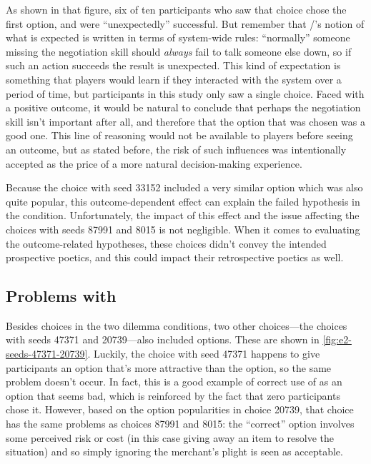 As shown in that figure, six of ten participants who saw that choice chose the first option, and were ``unexpectedly'' successful.
%
But remember that \dunyazad/'s notion of what is expected is written in terms of system-wide rules: ``normally'' someone missing the negotiation skill should \emph{always} fail to talk someone else down, so if such an action succeeds the result is unexpected.
%
This kind of expectation is something that players would learn if they interacted with the system over a period of time, but participants in this study only saw a single choice.
%
Faced with a positive outcome, it would be natural to conclude that perhaps the negotiation skill isn't important after all, and therefore that the option that was chosen was a good one.
%
This line of reasoning would not be available to players before seeing an outcome, but as stated before, the risk of such influences was intentionally accepted as the price of a more natural decision-making experience.


Because the choice with seed 33152 included a very similar  option which was also quite popular, this outcome-dependent effect can explain the failed hypothesis in the \unxs{} condition.
%
Unfortunately, the impact of this effect and the  issue affecting the choices with seeds 87991 and 8015 is not negligible.
%
When it comes to evaluating the outcome-related hypotheses, these choices didn't convey the intended prospective poetics, and this could impact their retrospective poetics as well.


\subsection{Problems with }


Besides choices in the two dilemma conditions, two other choices---the \obvs{} choices with seeds 47371 and 20739---also included  options.
%
These are shown in \cref{fig:e2-seeds-47371-20739}.
%
Luckily, the choice with seed 47371 happens to give participants an option that's more attractive than the  option, so the same problem doesn't occur.
%
In fact, this is a good example of correct use of  as an option that seems bad, which is reinforced by the fact that zero participants chose it.
%
However, based on the option popularities in choice 20739, that choice has the same problems as choices 87991 and 8015: the ``correct'' option involves some perceived risk or cost (in this case giving away an item to resolve the situation) and so simply ignoring the merchant's plight is seen as acceptable.


